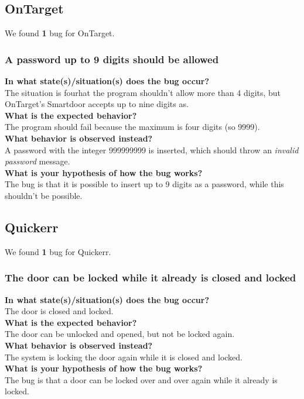 \documentclass{uva-inf-article}
\begin{document}
\subsection{OnTarget}
We found \textbf{1} bug for OnTarget.

\subsubsection{A password up to 9 digits should be allowed}
\textbf{In what state(s)/situation(s) does the bug occur?}\\
The situation is fourhat the program shouldn't allow more than 4 digits, but OnTarget's Smartdoor accepts up to nine digits as. \\
\textbf{What is the expected behavior?}\\
The program should fail because the maximum is four digits (so 9999).\\
\textbf{What behavior is observed instead?}\\
A password with the integer 999999999 is inserted, which should throw an \emph{invalid password} message.\\
\textbf{What is your hypothesis of how the bug works?}\\
The bug is that it is possible to insert up to 9 digits as a password, while this shouldn't be possible.

\subsection{Quickerr}
We found \textbf{1} bug for Quickerr.

\subsubsection{The door can be locked while it already is closed and locked}
\textbf{In what state(s)/situation(s) does the bug occur?}\\
The door is closed and locked.\\
\textbf{What is the expected behavior?}\\
The door can be unlocked and opened, but not be locked again.\\
\textbf{What behavior is observed instead?}\\
The system is locking the door again while it is closed and locked.\\
\textbf{What is your hypothesis of how the bug works?}\\
The bug is that a door can be locked over and over again while it already is locked.
\end{document}
